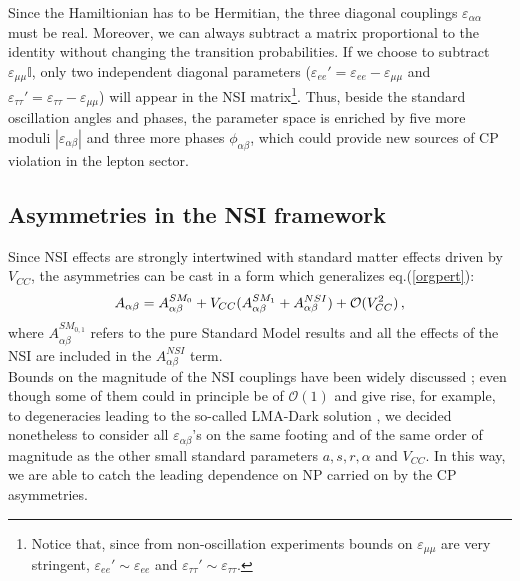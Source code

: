 \documentclass[12pt]{article}
\begin{document}
%
Since the Hamiltionian has to be Hermitian, the three diagonal couplings $\varepsilon_{\alpha\alpha}$ must be real. Moreover, we can always subtract a matrix proportional to the identity without changing the transition probabilities. If we choose to subtract $\varepsilon_{\mu\mu} \mathbb{I}$, only two independent diagonal parameters ($\varepsilon_{ee}'=\varepsilon_{ee}-\varepsilon_{\mu\mu}$ and $\varepsilon_{\tau\tau}'=\varepsilon_{\tau\tau}-\varepsilon_{\mu\mu}$) will appear in the NSI matrix\footnote{Notice that, since from non-oscillation experiments bounds on $\varepsilon_{\mu\mu}$ are very stringent, $\varepsilon_{ee}'\sim\varepsilon_{ee}$ and $\varepsilon_{\tau\tau}'\sim\varepsilon_{\tau\tau}$.}. Thus, beside the standard oscillation angles and phases, the parameter space is enriched by five more moduli $|\varepsilon_{\alpha\beta}|$ and three more phases $\phi_{\alpha\beta}$, which could provide new sources of CP violation in the lepton sector. 

\subsection{Asymmetries in the NSI framework}

Since NSI effects are strongly intertwined with standard matter effects driven by $V_{CC}$, the asymmetries can be cast in a form which generalizes eq.(\ref{orgpert}):
\begin{equation}\label{genform}
A_{\alpha\beta} =A_{\alpha\beta}^{SM_0} +V_{CC}(A_{\alpha\beta}^{SM_1} +  A_{\alpha\beta}^{NSI}) + {\cal O}(V_{CC}^2) \,,
\end{equation}
where $A_{\alpha\beta}^{SM_{0,1}}$ refers to the pure Standard Model results and all the effects of the NSI are included in the $A_{\alpha\beta}^{NSI}$ term. \\
Bounds on the magnitude of the NSI couplings have been widely discussed \cite{Dev:2019anc}; even though some of them could in principle be of $\mathcal{O}(1)$ and give rise, for example, to degeneracies leading to  the so-called  LMA-Dark  solution \cite{Miranda:2004nb},  we decided nonetheless to consider all $\varepsilon_{\alpha\beta}$'s on the same footing and of the same order of magnitude as the other small standard parameters $a,s,r,\alpha$ and $V_{CC}$. In this way, we are able to catch the leading dependence on NP carried on by the CP asymmetries.
\end{document}
